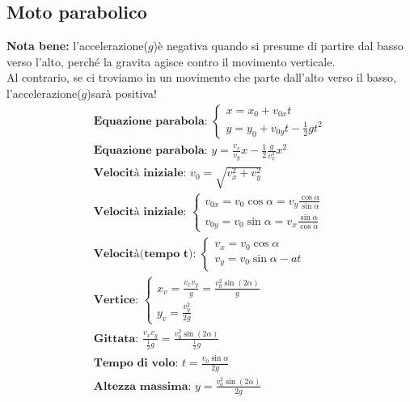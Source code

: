 \subsection{Moto parabolico}
\textbf{Nota bene: } l'accelerazione($g$)è negativa quando si presume di partire dal basso verso l'alto, perché la gravita agisce contro il movimento verticale. \\ Al contrario, se ci troviamo in un movimento che parte dall'alto verso il basso, l'accelerazione($g$)sarà positiva!
\begin{gather*}
\textbf{Equazione parabola: } \begin{cases}
    x = x_0 + v_{0x} t \\
    y = y_0 + v_{0y} t - \frac{1}{2} g t^2
\end{cases}
\\
\textbf{Equazione parabola: } y = \frac{v_x}{v_y} x - \frac{1}{2} \frac{g}{v_x^2} x^2 \\
\textbf{Velocità iniziale: } v_0 = \sqrt{v_x^2 + v_y^2} \\
\textbf{Velocità iniziale: } \begin{cases}
    v_{0x} = v_0 \cos \alpha  = v_y \frac{\cos \alpha}{\sin \alpha} \\
    v_{0y} = v_0 \sin \alpha = v_x \frac{\sin \alpha }{\cos \alpha}
\end{cases}
\\
\textbf{Velocità(tempo t): } \begin{cases}
    v_x = v_0 \cos \alpha \\
    v_y = v_0 \sin \alpha - a t
\end{cases}
\\
\textbf{Vertice: } \begin{cases}
    x_v = \frac{v_x v_y}{g} = \frac{v_0^2 \sin (2\alpha)}{g} \\
    y_v = \frac{v_y^2}{2g}
\end{cases}
\\
\textbf{Gittata: } \frac{v_x v_y}{\frac{1}{2}g} = \frac{v_0^2 \sin (2 \alpha)}{\frac{1}{2}g} \\
\textbf{Tempo di volo: } t = \frac{v_0 \sin \alpha}{2g} \\
\textbf{Altezza massima: } y = \frac{v_0^2 \sin (2 \alpha)}{2g}
\end{gather*}

